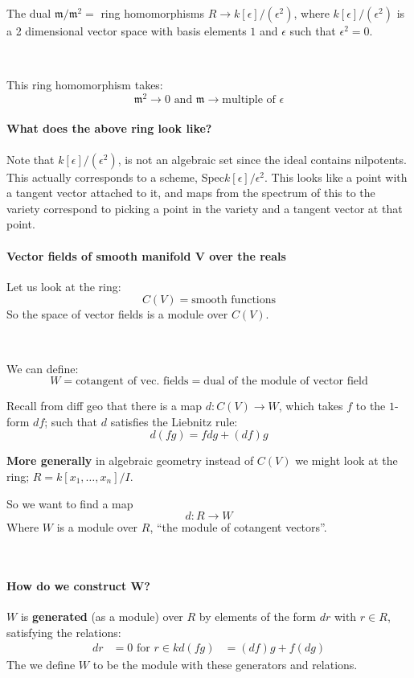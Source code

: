 The dual $\mathfrak{m}/\mathfrak{m}^2 = $ ring homomorphisms $R\rightarrow k[\epsilon]/(\epsilon^2)$, where $k[\epsilon]/(\epsilon^2)$ is a 2 dimensional vector space with basis elements $1$ and $\epsilon$ such that $\epsilon^2 = 0$.

\

This ring homomorphism takes:\[\mathfrak{m}^2\rightarrow 0 \text{ and }\mathfrak{m} \rightarrow \text{multiple of }\epsilon \]

\paragraph*{What does the above ring look like?}
Note that $k[\epsilon]/(\epsilon^2)$, is not an algebraic set since the ideal contains nilpotents. This actually corresponds to a scheme, Spec$k[\epsilon]/\epsilon^2$. This looks like a point with a tangent vector attached to it, and maps from the spectrum of this to the variety correspond to picking a point in the variety and a tangent vector at that point.

\paragraph*{Vector fields of smooth manifold V over the reals}
Let us look at the ring:\[C(V) = \text{smooth functions}\]
So the space of vector fields is a module over $C(V)$.

\

We can define:\[W = \text{cotangent of vec. fields} = \text{dual of the module of vector field}\]

Recall from diff geo that there is a map $d\colon C(V)\rightarrow W$, which takes $f$ to the $1$-form $df$; such that $d$ satisfies the Liebnitz rule: \[d(fg) = fdg + (df)g\]

\textbf{More generally} in algebraic geometry instead of $C(V)$ we might look at the ring; $R = k[x_1, \ldots,x_n]/I$.

So we want to find a map\[d\colon R\rightarrow W\]
Where $W$ is a module over $R$, ``the module of cotangent vectors''.

\

\paragraph*{How do we construct W?}

$W$ is \textbf{generated} (as a module) over $R$ by elements of the form $dr$ with $r\in R$, satisfying the relations:\begin{align*}
    dr &= 0 \text{ for }r\in k
    d(fg) &= (df)g+f(dg)
\end{align*}
The we define $W$ to be the module with these generators and relations.

